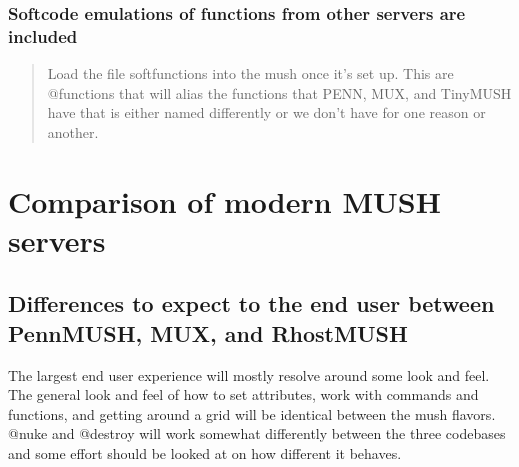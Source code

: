 \documentclass[letterpaper,10pt,english]{sphinxmanual}
\begin{document}
\subsubsection{Softcode emulations of functions from other servers are included}
\label{\detokenize{features:softcode-emulations-of-functions-from-other-servers-are-included}}\begin{quote}

\sphinxAtStartPar
Load the file softfunctions into the mush once it’s set up.  This are
@functions that will alias the functions that PENN, MUX, and TinyMUSH have
that is either named differently or we don’t have for one reason or another.
\end{quote}


\section{Comparison of modern MUSH servers}
\label{\detokenize{differences:comparison-of-modern-mush-servers}}\label{\detokenize{differences::doc}}

\subsection{Differences to expect to the end user between PennMUSH, MUX, and RhostMUSH}
\label{\detokenize{differences:differences-to-expect-to-the-end-user-between-pennmush-mux-and-rhostmush}}
\sphinxAtStartPar
The largest end user experience will mostly resolve around some look and feel.
The general look and feel of how to set attributes, work with commands and
functions, and getting around a grid will be identical between the mush flavors.
@nuke and @destroy will work somewhat differently between the three codebases
and some effort should be looked at on how different it behaves.
\end{document}
